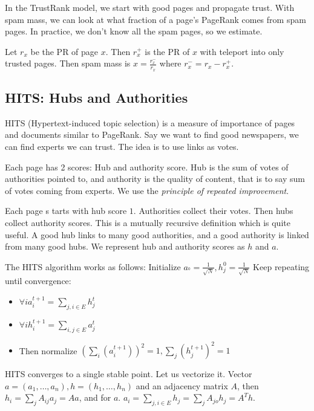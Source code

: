         In the TrustRank model, we start with good pages and propagate trust. With spam mass, we can look at what fraction of a page's PageRank comes from spam pages. In practice, we don't know all the spam pages, so we estimate.
        
        Let $r_x$ be the PR of page $x$. Then $r_x^+$ is the PR of $x$ with teleport into only trusted pages. Then spam mass is $x = \frac{r_x^-}{r_x}$ where $r_x^- = r_x - r_x^+$. 
    
    \subsection{HITS: Hubs and Authorities}
        HITS (Hypertext-induced topic selection) is a measure of importance of pages and documents similar to PageRank. Say we want to find good newspapers, we can find experts we can trust. The idea is to use links as votes. 
        
        Each page has 2 scores: Hub and authority score. Hub is the sum of votes of authorities pointed to, and authority is the quality of content, that is to say sum of votes coming from experts. We use the \emph{principle of repeated improvement}. 
        
        Each page s tarts with hub score $1$. Authorities collect their votes. Then hubs collect authority scores. This is a mutually recursive definition which is quite useful. A good hub links to many good authorities, and a good authority is linked from many good hubs. We represent hub and authority scores as $h$ and $a$. 
        
        The HITS algorithm works as follows:
        Initialize $a_^0 = \frac{1}{\sqrt{N}}, h_j^0 = \frac{1}{\sqrt{N}}$ Keep repeating
        until convergence:
        \begin{itemize}
            \item $\forall i a_i^{t+1} = \sum_{j, i \in E}h_j^t$
            \item $\forall i h_i^{t+1} = \sum_{i, j \in E}a_j^t$
            \item Then normalize $(\sum_i(a_i^{t+1}))^2 = 1, \sum_j(h_j^{t+1})^2 = 1$
        \end{itemize}
        
        HITS converges to a single stable point. Let us vectorize it.
        Vector $a = (a_1, \dots, a_n), h = (h_1, \dots, h_n)$ and an adjacency matrix $A$, then $h_i = \sum_j A_{ij}a_j = Aa$, and for $a$. $a_i = \sum_{j, i \in E}h_j = \sum_j A_{jo} h_j = A^T h$.
        
